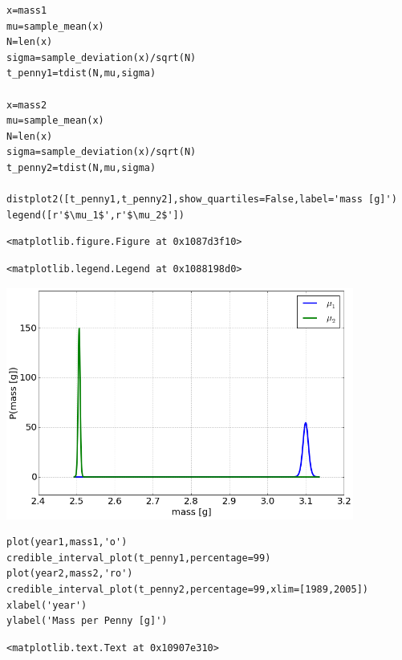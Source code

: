 \begin{lstlisting}
x=mass1
mu=sample_mean(x)
N=len(x)
sigma=sample_deviation(x)/sqrt(N)
t_penny1=tdist(N,mu,sigma)

x=mass2
mu=sample_mean(x)
N=len(x)
sigma=sample_deviation(x)/sqrt(N)
t_penny2=tdist(N,mu,sigma)

distplot2([t_penny1,t_penny2],show_quartiles=False,label='mass [g]')
legend([r'$\mu_1$',r'$\mu_2$'])

\end{lstlisting}

\begin{verbatim}
<matplotlib.figure.Figure at 0x1087d3f10>\end{verbatim}

\begin{verbatim}
<matplotlib.legend.Legend at 0x1088198d0>
\end{verbatim}

\begin{center}\includegraphics[width=4.5in]{Applications_of_Parameter_Estimation/Applications_of_Parameter_Estimation_fig7.png}\end{center}

\begin{lstlisting}
plot(year1,mass1,'o')
credible_interval_plot(t_penny1,percentage=99)
plot(year2,mass2,'ro')
credible_interval_plot(t_penny2,percentage=99,xlim=[1989,2005])
xlabel('year')
ylabel('Mass per Penny [g]')
\end{lstlisting}

\begin{verbatim}
<matplotlib.text.Text at 0x10907e310>
\end{verbatim}

